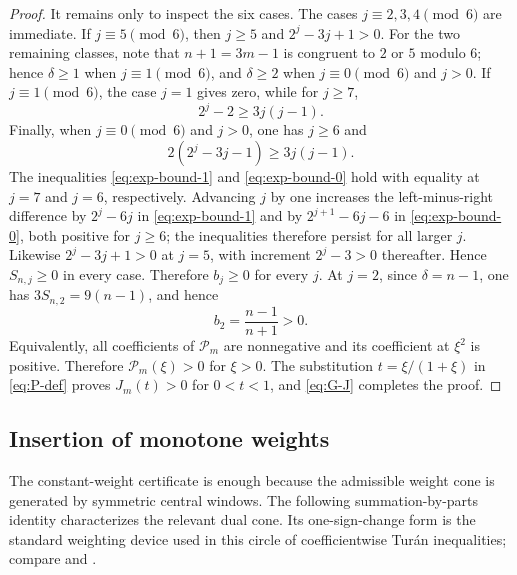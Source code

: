 \documentclass[11pt,a4paper]{amsart}
\numberwithin{equation}{section}
\theoremstyle{plain}
\theoremstyle{definition}
\begin{document}
\begin{proof}
It remains only to inspect the six cases.  The cases
\(j\equiv2,3,4\pmod6\) are immediate.  If \(j\equiv5\pmod6\), then \(j\ge5\) and
\(2^j-3j+1>0\).
For the two remaining classes, note that \(n+1=3m-1\) is congruent to \(2\) or
\(5\) modulo \(6\); hence \(\delta\ge1\) when \(j\equiv1\pmod6\), and
\(\delta\ge2\) when \(j\equiv0\pmod6\) and \(j>0\).
If \(j\equiv1\pmod6\), the case \(j=1\) gives zero, while for
\(j\ge7\),
\begin{equation}\label{eq:exp-bound-1}
 2^j-2\ge3j(j-1).
\end{equation}
Finally, when \(j\equiv0\pmod6\) and \(j>0\), one has \(j\ge6\) and
\begin{equation}\label{eq:exp-bound-0}
 2(2^j-3j-1)\ge3j(j-1).
\end{equation}
The inequalities \eqref{eq:exp-bound-1} and \eqref{eq:exp-bound-0} hold with
equality at \(j=7\) and \(j=6\), respectively.  Advancing \(j\) by one increases the
left-minus-right difference by \(2^j-6j\) in \eqref{eq:exp-bound-1} and by
\(2^{j+1}-6j-6\) in \eqref{eq:exp-bound-0}, both positive for \(j\ge6\); the
inequalities therefore persist for all larger \(j\).  Likewise \(2^j-3j+1>0\) at
\(j=5\), with increment \(2^j-3>0\) thereafter.  Hence \(S_{n,j}\ge0\) in every
case.  Therefore \(b_j\ge0\) for every \(j\).  At
\(j=2\), since \(\delta=n-1\), one has \(3S_{n,2}=9(n-1)\), and hence
\[
 b_2=\frac{n-1}{n+1}>0.
\]
Equivalently, all coefficients of \(\mathcal P_m\) are nonnegative and its
coefficient at \(\xi^2\) is positive.  Therefore \(\mathcal P_m(\xi)>0\) for
\(\xi>0\).  The substitution
\(t=\xi/(1+\xi)\) in \eqref{eq:P-def} proves \(J_m(t)>0\) for \(0<t<1\), and
\eqref{eq:G-J} completes the proof.
\end{proof}


\subsection{Insertion of monotone weights}\label{subsec:insertion-monotone-weights}

The constant-weight certificate is enough because the admissible weight cone is
generated by symmetric central windows.  The following summation-by-parts identity
characterizes the relevant dual cone.  Its one-sign-change form is the standard weighting
device used in this circle of coefficientwise Tur\'an inequalities; compare
\cite[Lem.~6]{KalmykovKarp2013Ratios} and
\cite[Lem.~2.1]{KalmykovKarp2013Reciprocal}.
\end{document}
